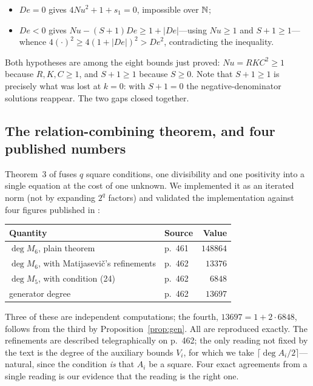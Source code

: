 \begin{itemize}[nosep]
  \item $\mathit{De}=0$ gives $4\mathit{Nu}^2+1+s_1=0$, impossible over $\mathbb{N}$;
  \item $\mathit{De}<0$ gives
        $\mathit{Nu}-(S{+}1)\mathit{De}\ge1+|\mathit{De}|$---using
        $\mathit{Nu}\ge1$ and $S+1\ge1$---whence
        $4(\cdot)^2\ge4(1+|\mathit{De}|)^2>\mathit{De}^2$, contradicting the
        inequality.
\end{itemize}

Both hypotheses are among the eight bounds just proved: $\mathit{Nu}=RKC^2\ge1$
because $R,K,C\ge1$, and $S+1\ge1$ because $S\ge0$. Note that $S+1\ge1$ is
precisely what was lost at $k=0$: with $S+1=0$ the negative-denominator
solutions reappear. The two gaps closed together.

\subsection{The relation-combining theorem, and four published numbers}

Theorem~3 of \cite{mr1975} fuses $q$ square conditions, one divisibility and one
positivity into a single equation at the cost of one unknown. We implemented it
as an iterated norm (not by expanding $2^q$ factors) and validated the
implementation against four figures published in \cite{jsww1976}:

\begin{center}
\begin{tabular}{@{}llr@{}}
\toprule
\textbf{Quantity} & \textbf{Source} & \textbf{Value} \\
\midrule
$\deg M_6$, plain theorem & p.~461 & $148864$ \\
$\deg M_6$, with Matijasevi\v{c}'s refinements & p.~462 & $13376$ \\
$\deg M_5$, with condition (24) & p.~462 & $6848$ \\
generator degree & p.~462 & $13697$ \\
\bottomrule
\end{tabular}
\end{center}

Three of these are independent computations; the fourth, $13697=1+2\cdot6848$,
follows from the third by Proposition~\ref{prop:gen}. All are reproduced
exactly. The refinements are described telegraphically
on p.~462; the only reading not fixed by the text is the degree of the auxiliary
bounds $V_i$, for which we take $\lceil \deg A_i/2\rceil$---natural, since the
condition \emph{is} that $A_i$ be a square. Four exact agreements from a single
reading is our evidence that the reading is the right one.

